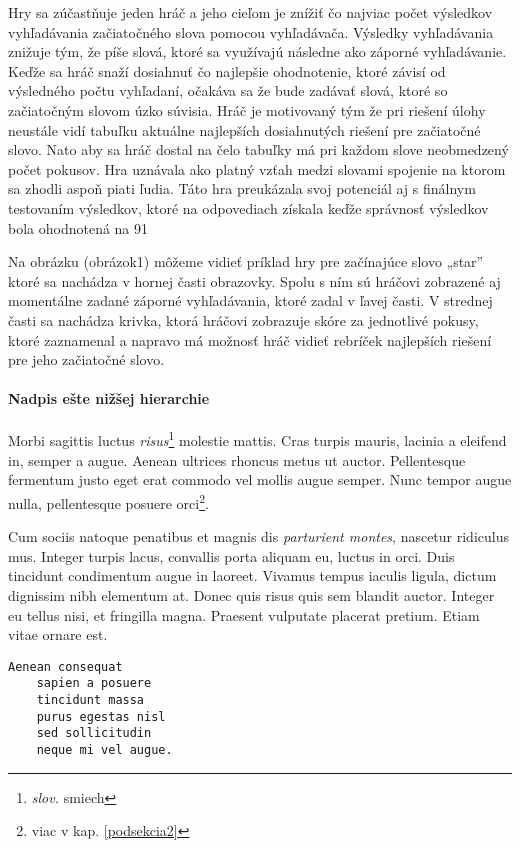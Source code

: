 Hry sa zúčastňuje jeden hráč a jeho cieľom je znížiť čo najviac počet výsledkov vyhľadávania začiatočného slova pomocou vyhľadávača. Výsledky vyhľadávania znižuje tým, že píše slová, ktoré sa využívajú následne ako záporné vyhľadávanie. Keďže sa hráč snaží dosiahnuť čo najlepšie ohodnotenie, ktoré závisí od výsledného počtu vyhľadaní, očakáva sa že bude zadávať slová, ktoré so začiatočným slovom úzko súvisia. Hráč je motivovaný tým že pri riešení úlohy neustále vidí tabuľku aktuálne najlepších dosiahnutých riešení pre začiatočné slovo. Nato aby sa hráč dostal na čelo tabuľky má pri každom slove neobmedzený počet pokusov. Hra uznávala ako platný vzťah medzi slovami spojenie na ktorom sa zhodli aspoň piati ľudia. Táto hra preukázala svoj potenciál aj s finálnym testovaním výsledkov, ktoré na odpovediach získala keďže správnosť výsledkov bola ohodnotená na 91%

Na obrázku (obrázok1) môžeme vidieť príklad hry pre začínajúce slovo „star” ktoré sa nachádza v hornej časti obrazovky. Spolu s ním sú hráčovi zobrazené aj momentálne zadané záporné vyhľadávania, ktoré zadal v ľavej časti. V strednej časti sa nachádza krivka, ktorá hráčovi zobrazuje skóre za jednotlivé pokusy, ktoré zaznamenal a napravo má možnosť hráč vidieť rebríček najlepších riešení pre jeho začiatočné slovo.


\paragraph{Nadpis ešte nižšej hierarchie}\label{nadpis75}
Morbi sagittis luctus \emph{risus}\footnote{\emph{slov.} smiech} molestie mattis. Cras turpis mauris, lacinia a eleifend in, semper a augue. Aenean ultrices rhoncus metus ut auctor. Pellentesque fermentum justo eget erat commodo vel mollis augue semper. Nunc tempor augue nulla, pellentesque posuere orci\footnote{viac v kap. \ref{podsekcia2}}.

Cum sociis natoque penatibus et magnis dis \emph{parturient montes}, nascetur ridiculus mus. Integer turpis lacus, convallis porta aliquam eu, luctus in orci. Duis tincidunt condimentum augue in laoreet. Vivamus tempus iaculis ligula, dictum dignissim nibh elementum at. Donec quis risus quis sem blandit auctor. Integer eu tellus nisi, et fringilla magna. Praesent vulputate placerat pretium. Etiam vitae ornare est.\\


\begin{lstlisting}[float=h,caption={Príklad listingu priamo v latex-u}, label={listing2},
	keywordstyle=\color{blue}\bfseries, ndkeywordstyle=\color{black}\bfseries, commentstyle=\color{red}\ttfamily,
	stringstyle=\color{green}\ttfamily, identifierstyle=\color{gray},backgroundcolor=\color{white},frame=single, frameround=ffff,captionpos=b,basicstyle=\scriptsize]
    Aenean consequat
    sapien a posuere
    tincidunt massa
    purus egestas nisl
    sed sollicitudin
    neque mi vel augue.
\end{lstlisting}

